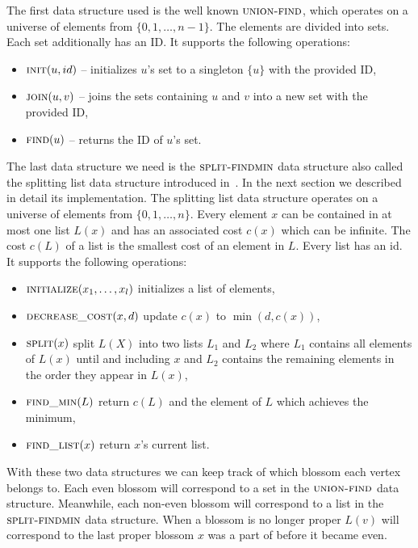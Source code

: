 The first data structure used is the well known $\textsc{union-find}$, which operates on a universe of elements from $\{ 0, 1, \dots, n-1 \}$. The elements are divided into sets. Each set additionally has an ID\@. It supports the following operations:

\begin{itemize}
    \item $\textsc{init}(u, id)$ – initializes $u$'s set to a singleton $\{u\}$ with the provided ID,
    \item $\textsc{join}(u, v)$ – joins the sets containing $u$ and $v$ into a new set with the provided ID,
    \item $\textsc{find}(u)$ – returns the ID of $u$'s set.
\end{itemize}

The last data structure we need is the $\textsc{split-findmin}$ data structure also called the splitting list data structure introduced in~\cite{gabow1985scaling}. In the next section we described in detail its implementation. The splitting list data structure operates on a universe of elements from $\{0, 1, \dots, n\}$. Every element $x$ can be contained in at most one list $L(x)$ and has an associated cost $c(x)$ which can be infinite. The cost $c(L)$ of a list is the smallest cost of an element in $L$. Every list has an id. It supports the following operations:

\begin{itemize}
    \item $\textsc{initialize}(x_1, \dots, x_l)$ initializes a list of elements,
    \item $\textsc{decrease\_cost}(x, d)$ update $c(x)$ to $\min(d, c(x))$,
    \item $\textsc{split}(x)$ split $L(X)$ into two lists $L_1$ and $L_2$ where $L_1$ contains all elements of $L(x)$ until and including $x$ and $L_2$ contains the remaining elements in the order they appear in $L(x)$,
    \item $\textsc{find\_min}(L)$ return $c(L)$ and the element of $L$ which achieves the minimum,
    \item $\textsc{find\_list}(x)$ return $x$'s current list.
\end{itemize}

With these two data structures we can keep track of which blossom each vertex belongs to. Each even blossom will correspond to a set in the $\textsc{union-find}$ data structure. Meanwhile, each non-even blossom will correspond to a list in the $\textsc{split-findmin}$ data structure. When a blossom is no longer proper $L(v)$ will correspond to the last proper blossom $x$ was a part of before it became even.

